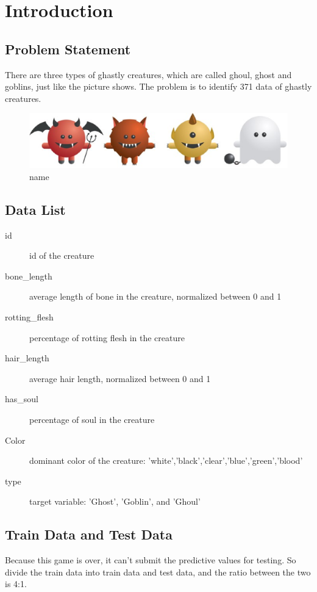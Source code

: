 
\section{Introduction}\label{sec-intro}

\subsection{Problem Statement}
There are three types of ghastly creatures, which are called ghoul, ghost and goblins, just like the picture shows. The problem is to identify 371 data of ghastly creatures. 


\begin{figure}[htbp]\centering
	\includegraphics[scale=0.3]{figures/bar.eps}
	\caption{name}
\end{figure}


\subsection{Data List}

\begin{description}
	\item[id] id of the creature
	\item[bone_length] average length of bone in the creature, normalized between 0 and 1
	\item[rotting_flesh] percentage of rotting flesh in the creature
	\item[hair_length] average hair length, normalized between 0 and 1
	\item[has_soul] percentage of soul in the creature
	\item[Color] dominant color of the creature: 'white','black','clear','blue','green','blood'
	\item[type] target variable: 'Ghost', 'Goblin', and 'Ghoul'
\end{description}

\subsection{Train Data and Test Data}
Because this game is over, it can't submit the predictive values for testing. So divide the train data into train data and test data, and the ratio between the two is 4:1.

